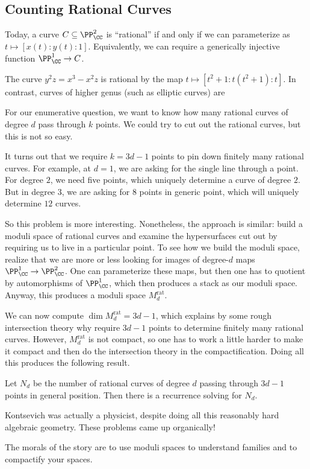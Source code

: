 \documentclass{article}
\begin{document}
\subsection{Counting Rational Curves}
Today, a curve $C\subseteq\PP^2_\CC$ is ``rational'' if and only if we can parameterize as $t\mapsto[x(t):y(t):1]$. Equivalently, we can require a generically injective function $\PP^1_\CC\to C$.
\begin{example}
	The curve $y^2z=x^3-x^2z$ is rational by the map $t\mapsto\left[t^2+1:t(t^2+1):t\right]$. In contrast, curves of higher genus (such as elliptic curves) are 
\end{example}
For our enumerative question, we want to know how many rational curves of degree $d$ pass through $k$ points. We could try to cut out the rational curves, but this is not so easy.

It turns out that we require $k=3d-1$ points to pin down finitely many rational curves. For example, at $d=1$, we are asking for the single line through a point. For degree $2$, we need five points, which uniquely determine a curve of degree $2$. But in degree $3$, we are asking for $8$ points in generic point, which will uniquely determine $12$ curves.

So this problem is more interesting. Nonetheless, the approach is similar: build a moduli space of rational curves and examine the hypersurfaces cut out by requiring us to live in a particular point. To see how we build the moduli space, realize that we are more or less looking for images of degree-$d$ maps $\PP^1_\CC\to\PP^2_\CC$. One can parameterize these maps, but then one has to quotient by automorphisms of $\PP^1_\CC$, which then produces a stack as our moduli space. Anyway, this produces a moduli space $M_d^{\mathrm{rat}}$.

We can now compute $\dim M_d^{\mathrm{rat}}=3d-1$, which explains by some rough intersection theory why require $3d-1$ points to determine finitely many rational curves. However, $M_d^{\mathrm{rat}}$ is not compact, so one has to work a little harder to make it compact and then do the intersection theory in the compactification. Doing all this produces the following result.
\begin{theorem}[Kontsevich]
	Let $N_d$ be the number of rational curves of degree $d$ passing through $3d-1$ points in general position. Then there is a recurrence solving for $N_d$.
\end{theorem}
\begin{remark}
	Kontsevich was actually a physicist, despite doing all this reasonably hard algebraic geometry. These problems came up organically!
\end{remark}
The morals of the story are to use moduli spaces to understand families and to compactify your spaces.
\end{document}
